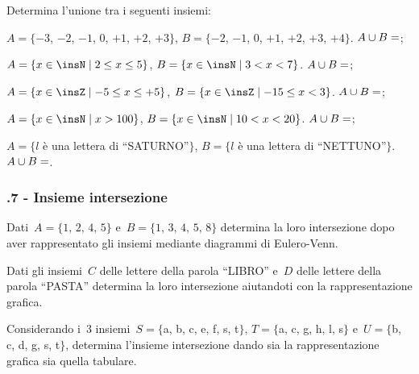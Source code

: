 \begin{esercizio}
\label{ese:\thechapter.55}
Determina l'unione tra i seguenti insiemi:

\begin{enumeratea}
 \item $A=\{-3$, $-2$, $-1$, $0$, $+1$, $+2$, $+3\}$, $B=\{-2$, $-1$, $0$, $+1$, $+2$, $+3$, $+4\}$. $A\cup B=\dotfill$;
 \item $A=\{x\in\insN\mid 2\le x\le 5\}$, $B=\{x\in\insN\mid 3<x<7\}$. $A\cup B=\dotfill$;
 \item $A=\{x\in\insZ\mid -5\le x\le +5\}$, $B=\{x\in\insZ\mid -15\le x<3\}$. $A\cup B=\dotfill$;
 \item $A=\{x\in\insN\mid x>100\}$, $B=\{x\in\insN\mid 10<x<20\}$. $A\cup B=\dotfill$;
 \item $A=\{l$ è una lettera di ``SATURNO''$\}$, $B=\{l$ è una lettera di ``NETTUNO''$\}$. $A\cup B=\dotfill$.
\end{enumeratea}
\end{esercizio}

\subsubsection*{\thechapter.7 - Insieme intersezione}
 \begin{esercizio}
 \label{ese:\thechapter.56}
Dati~$A=\{\text{1, 2, 4, 5}\}$ e~$B=\{\text{1, 3, 4, 5, 8}\}$ determina la loro
intersezione dopo aver rappresentato gli insiemi mediante diagrammi di
Eulero-Venn.
\end{esercizio}

\begin{esercizio}
 \label{ese:\thechapter.57}
Dati gli insiemi~$C$ delle lettere della parola ``LIBRO'' e~$D$ delle lettere della
parola ``PASTA'' determina la loro intersezione aiutandoti con la rappresentazione grafica.
\end{esercizio}

\begin{esercizio}
 \label{ese:\thechapter.58}
Considerando i~3 insiemi~$S=\{$a, b, c, e, f, s, t$\}$, $T=\{$a, c, g, h, l, s$\}$ e~$U=\{$b, c, d, g, s, t$\}$,
determina l'insieme intersezione dando sia la rappresentazione grafica sia quella tabulare.
 \end{esercizio}

